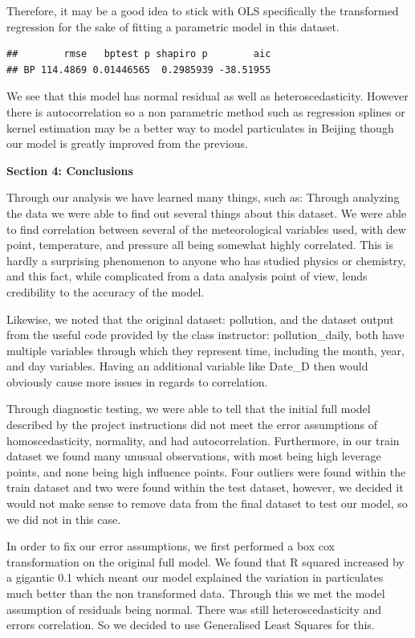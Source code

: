 \documentclass[
]{report}
\begin{document}
Therefore, it may be a good idea to stick with OLS specifically the
transformed regression for the sake of fitting a parametric model in
this dataset.

\begin{verbatim}
##        rmse   bptest p shapiro p        aic
## BP 114.4869 0.01446565  0.2985939 -38.51955
\end{verbatim}

We see that this model has normal residual as well as
heteroscedasticity. However there is autocorrelation so a non parametric
method such as regression splines or kernel estimation may be a better
way to model particulates in Beijing though our model is greatly
improved from the previous.

\textbf{Section 4: Conclusions}

Through our analysis we have learned many things, such as: Through
analyzing the data we were able to find out several things about this
dataset. We were able to find correlation between several of the
meteorological variables used, with dew point, temperature, and pressure
all being somewhat highly correlated. This is hardly a surprising
phenomenon to anyone who has studied physics or chemistry, and this
fact, while complicated from a data analysis point of view, lends
credibility to the accuracy of the model.

Likewise, we noted that the original dataset: pollution, and the dataset
output from the useful code provided by the class instructor:
pollution\_daily, both have multiple variables through which they
represent time, including the month, year, and day variables. Having an
additional variable like Date\_D then would obviously cause more issues
in regards to correlation.

Through diagnostic testing, we were able to tell that the initial full
model described by the project instructions did not meet the error
assumptions of homoscedasticity, normality, and had autocorrelation.
Furthermore, in our train dataset we found many unusual observations,
with most being high leverage points, and none being high influence
points. Four outliers were found within the train dataset and two were
found within the test dataset, however, we decided it would not make
sense to remove data from the final dataset to test our model, so we did
not in this case.

In order to fix our error assumptions, we first performed a box cox
transformation on the original full model. We found that R squared
increased by a gigantic 0.1 which meant our model explained the
variation in particulates much better than the non transformed data.
Through this we met the model assumption of residuals being normal.
There was still heteroscedasticity and errors correlation. So we decided
to use Generalised Least Squares for this.
\end{document}
